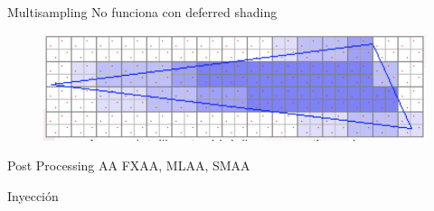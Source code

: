 \documentclass[table]{beamer}
\begin{document}
\begin{frame}[fragile]{Multisampling}
    No funciona con deferred shading

    \begin{figure}
        \includegraphics[width=\linewidth]{./figures/msaasample.png}
    \end{figure}
\end{frame}

\begin{frame}[fragile]{Post Processing AA}
    FXAA, MLAA, SMAA

    Inyección


\end{frame}
\end{document}
